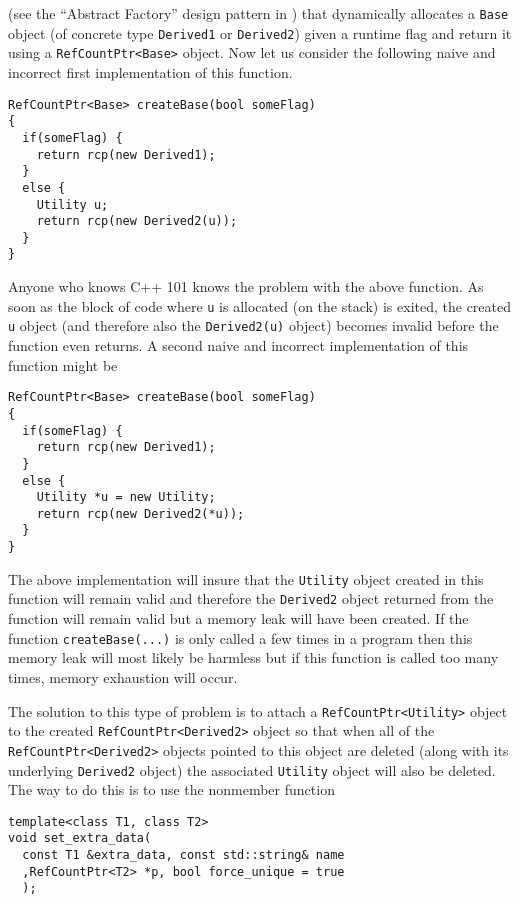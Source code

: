 {}\indent{}(see the ``Abstract Factory'' design pattern in
{}\cite{ref:gama_et_al_1995}) that dynamically allocates a
{}\texttt{Base} object (of concrete type {}\texttt{Derived1} or
{}\texttt{Derived2}) given a runtime flag and return it using a
{}\texttt{RefCountPtr<Base>} object.  Now let us consider the
following naive and incorrect first implementation of this function.

{\scriptsize\begin{verbatim}
RefCountPtr<Base> createBase(bool someFlag)
{
  if(someFlag) {
    return rcp(new Derived1);
  }
  else {
    Utility u;
    return rcp(new Derived2(u));
  }
}
\end{verbatim}

}{}\noindent{}Anyone who knows C++ 101 knows the problem with the
above function.  As soon as the block of code where {}\texttt{u} is
allocated (on the stack) is exited, the created {}\texttt{u} object
(and therefore also the {}\texttt{Derived2(u)} object) becomes invalid
before the function even returns.  A second naive and incorrect
implementation of this function might be

{\scriptsize\begin{verbatim}
RefCountPtr<Base> createBase(bool someFlag)
{
  if(someFlag) {
    return rcp(new Derived1);
  }
  else {
    Utility *u = new Utility;
    return rcp(new Derived2(*u));
  }
}
\end{verbatim}}

{}\noindent{} The above implementation will insure that the
{}\texttt{Utility} object created in this function will remain valid
and therefore the {}\texttt{Derived2} object returned from the
function will remain valid but a memory leak will have been created.
If the function {}\texttt{create\-Base(...)}  is only called a few
times in a program then this memory leak will most likely be harmless
but if this function is called too many times, memory exhaustion will
occur.

The solution to this type of problem is to attach a
{}\texttt{RefCountPtr<Utility>} object to the created
{}\texttt{RefCountPtr<Derived2>} object so that when all of the
{}\texttt{RefCountPtr<Derived2>} objects pointed to this object are
deleted (along with its underlying {}\texttt{Derived2} object) the
associated {}\texttt{Utility} object will also be deleted.  The way to
do this is to use the nonmember function

{\scriptsize\begin{verbatim}
template<class T1, class T2>
void set_extra_data(
  const T1 &extra_data, const std::string& name
  ,RefCountPtr<T2> *p, bool force_unique = true
  );
\end{verbatim}}

